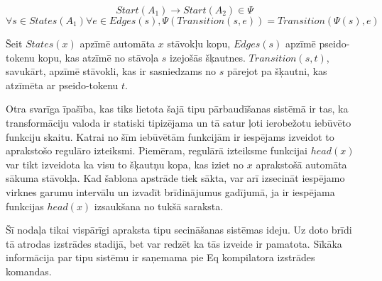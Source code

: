 \[
    Start (A_1) \to Start (A_2) \in \Psi
\]
\[
    \forall s \in States (A_1) \forall e \in Edges (s),
    \Psi (Transition (s, e)) = Transition (\Psi (s), e)
\]

Šeit $States (x)$ apzīmē automāta $x$ stāvokļu kopu, $Edges (s)$ apzīmē pseido-tokenu kopu, kas atzīmē no stāvoļa $s$ izejošās šķautnes. $Transition(s, t)$, savukārt, apzīmē stāvokli, kas ir sasniedzams no $s$ pārejot pa šķautni, kas atzīmēta ar pseido-tokenu $t$.

Otra svarīga īpašība, kas tiks lietota šajā tipu pārbaudīšanas sistēmā ir tas, ka transformāciju valoda ir statiski tipizējama un tā satur ļoti ierobežotu iebūvēto funkciju skaitu. Katrai no šīm iebūvētām funkcijām ir iespējams izveidot to aprakstošo regulāro izteiksmi. Piemēram, regulārā izteiksme funkcijai $head (x)$ var tikt izveidota ka visu to šķautņu kopa, kas iziet no $x$ aprakstošā automāta sākuma stāvokļa. Kad šablona apstrāde tiek sākta, var arī izsecināt iespējamo virknes garumu intervālu un izvadīt brīdinājumus gadījumā, ja ir iespējama funkcijas $head (x)$ izsaukšana no tukšā saraksta.


Šī nodaļa tikai vispārīgi apraksta tipu secināšanas sistēmas ideju. Uz doto brīdi tā atrodas izstrādes stadijā, bet var redzēt ka tās izveide ir pamatota. Sīkāka informācija par tipu sistēmu ir saņemama pie Eq kompilatora izstrādes komandas.